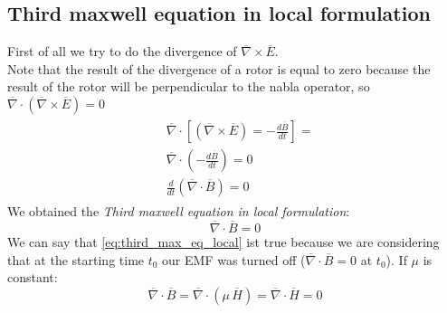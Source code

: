 \subsection*{Third maxwell equation in local formulation}
First of all we try to do the divergence of $\overline{\nabla}\times\overline{E}$.\\ 
Note that the result of the divergence of a rotor is equal to zero because the result of the rotor will be perpendicular to the nabla operator, so $\overline{\nabla}\cdot(\overline{\nabla}\times\overline{E})=0$
\begin{align}
    \begin{split}
        &\overline{\nabla} \cdot \left[ (\overline{\nabla}\times \overline{E})=-\frac{d\overline{B}}{dt}\right]=\\[5pt]
        &\overline{\nabla} \cdot \left(-\frac{d\overline{B}}{dt}\right)=0\\[5pt]
        &\frac{d}{dt}(\overline{\nabla}\cdot \overline{B})=0
    \end{split}
\end{align}
We obtained the \emph{Third maxwell equation in local formulation}:
\begin{equation}\label{eq:third_max_eq_local}
    \overline{\nabla}\cdot \overline{B}=0
\end{equation}
We can say that \cref{eq:third_max_eq_local} ist true because we are considering that at the starting time $t_0$ our EMF was turned off ($\overline{\nabla}\cdot \overline{B}=0 $ at $t_0$).
If $\mu$ is constant:
\begin{equation}
    \overline{\nabla}\cdot \overline{B}=\overline{\nabla}\cdot(\mu\,\overline{H})=\overline{\nabla}\cdot\overline{H}=0
\end{equation}
